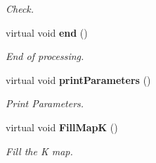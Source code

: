 \begin{DoxyCompactItemize}
\begin{DoxyCompactList}\small\item\em Check. \end{DoxyCompactList}\item 
virtual void {\bf end} ()\label{classCALICE_1_1Ahc2MIP2GeVProcessor_ae0c106a5baa6cffe68639653bf079a67}

\begin{DoxyCompactList}\small\item\em End of processing. \end{DoxyCompactList}\item 
virtual void {\bf print\-Parameters} ()\label{classCALICE_1_1Ahc2MIP2GeVProcessor_ae502a5cb0cc0eaeaa63440ccbd7654cf}

\begin{DoxyCompactList}\small\item\em Print Parameters. \end{DoxyCompactList}\item 
virtual void {\bf Fill\-Map\-K} ()\label{classCALICE_1_1Ahc2MIP2GeVProcessor_a7e200e2780196bdac74de34c48b0e8ea}

\begin{DoxyCompactList}\small\item\em Fill the K map. \end{DoxyCompactList}\end{DoxyCompactItemize}
